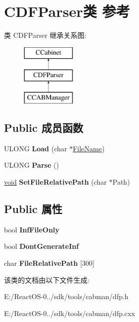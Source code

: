 \hypertarget{class_c_d_f_parser}{}\section{C\+D\+F\+Parser类 参考}
\label{class_c_d_f_parser}
类 C\+D\+F\+Parser 继承关系图\+:\begin{figure}[H]
\begin{center}
\leavevmode
\includegraphics[height=3.000000cm]{class_c_d_f_parser}
\end{center}
\end{figure}
\subsection*{Public 成员函数}
\begin{DoxyCompactItemize}
\item 
\mbox{\label{class_c_d_f_parser_ae38077ba1d133d6aa240c78196a0a912}} 
U\+L\+O\+NG {\bfseries Load} (char $\ast$\hyperlink{struct___file_name}{File\+Name})
\item 
\mbox{\label{class_c_d_f_parser_adee47449cca0a95c8def11de00f13654}} 
U\+L\+O\+NG {\bfseries Parse} ()
\item 
\mbox{\label{class_c_d_f_parser_a1d6e5f84c3e42fb623bb672ba8dcbcfa}} 
\hyperlink{interfacevoid}{void} {\bfseries Set\+File\+Relative\+Path} (char $\ast$Path)
\end{DoxyCompactItemize}
\subsection*{Public 属性}
\begin{DoxyCompactItemize}
\item 
\mbox{\label{class_c_d_f_parser_aa08cdfd0dc9883e9794978c162b3549f}} 
bool {\bfseries Inf\+File\+Only}
\item 
\mbox{\label{class_c_d_f_parser_a95d28736de8e02188b186e677fbe0c75}} 
bool {\bfseries Dont\+Generate\+Inf}
\item 
\mbox{\label{class_c_d_f_parser_a56c3e15c2c584666754bb0ec38e884a7}} 
char {\bfseries File\+Relative\+Path} \mbox{[}300\mbox{]}
\end{DoxyCompactItemize}


该类的文档由以下文件生成\+:\begin{DoxyCompactItemize}
\item 
E\+:/\+React\+O\+S-\/0../sdk/tools/cabman/dfp.\+h\item 
E\+:/\+React\+O\+S-\/0../sdk/tools/cabman/dfp.\+cxx\end{DoxyCompactItemize}
